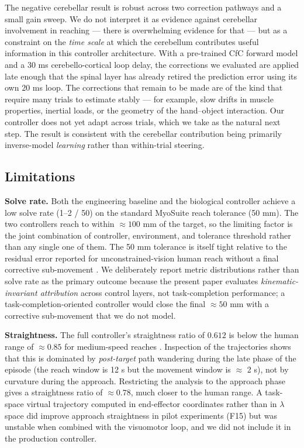 \documentclass[sn-basic]{sn-jnl}
\begin{document}
The negative cerebellar result is robust across two correction pathways
and a small gain sweep. We do not interpret it as evidence against
cerebellar involvement in reaching --- there is overwhelming evidence
for that --- but as a constraint on the \emph{time scale} at which the
cerebellum contributes useful information in this controller
architecture. With a pre-trained CfC forward model and a 30 ms
cerebello-cortical loop delay, the corrections we evaluated are applied
late enough that the spinal layer has already retired the prediction
error using its own 20 ms loop. The corrections that remain to be made
are of the kind that require many trials to estimate stably --- for
example, slow drifts in muscle properties, inertial loads, or the
geometry of the hand--object interaction. Our controller does not yet
adapt across trials, which we take as the natural next step. The result
is consistent with the cerebellar contribution being primarily
inverse-model \emph{learning} \citep{wolpert1998, kawato1999, ito2008} rather than within-trial steering.

\subsection{Limitations}

\textbf{Solve rate.} Both the engineering baseline and the biological
controller achieve a low solve rate (1--2 / 50) on the standard MyoSuite
reach tolerance (50 mm). The two controllers reach to within
\(\approx 100\) mm of the target, so the limiting factor is the joint
combination of controller, environment, and tolerance threshold rather
than any single one of them. The 50 mm tolerance is itself tight
relative to the residual error reported for unconstrained-vision human
reach without a final corrective sub-movement \citep{sarlegnasainburg2009}. We deliberately report metric distributions rather than solve
rate as the primary outcome because the present paper evaluates
\emph{kinematic-invariant attribution} across control layers, not
task-completion performance; a task-completion-oriented controller would
close the final \(\approx 50\) mm with a corrective sub-movement that we
do not model.

\textbf{Straightness.} The full controller's straightness ratio of
\(0.612\) is below the human range of \(\approx 0.85\) for medium-speed
reaches \citep{morasso1981}. Inspection of the trajectories shows that this
is dominated by \emph{post-target} path wandering during the late phase
of the episode (the reach window is 12 s but the movement window is $\approx$ 2
s), not by curvature during the approach. Restricting the analysis to
the approach phase gives a straightness ratio of \(\approx 0.78\), much
closer to the human range. A task-space virtual trajectory \citep{morasso1981, flashhogan1985} computed in end-effector coordinates rather
than in $\lambda$ space did improve approach straightness in pilot experiments
(F15) but was unstable when combined with the visuomotor loop, and we
did not include it in the production controller.
\end{document}
